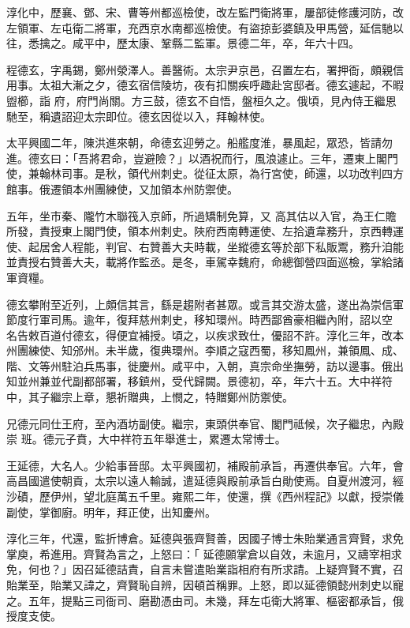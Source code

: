 \begin{pinyinscope}
 淳化中，歷襄、鄧、宋、曹等州都巡檢使，改左監門衛將軍，屢部徒修護河防，改左領軍、左屯衛二將軍，充西京水南都巡檢使。有盜掠彭婆鎮及甲馬營，延信馳以往，悉擒之。咸平中，歷太康、鞏縣二監軍。景德二年，卒，年六十四。



 程德玄，字禹錫，鄭州滎澤人。善醫術。太宗尹京邑，召置左右，署押衙，頗親信用事。太祖大漸之夕，德玄宿信陵坊，夜有扣關疾呼趣赴宮邸者。德玄遽起，不暇盥櫛，詣
 府，府門尚關。方三鼓，德玄不自悟，盤桓久之。俄頃，見內侍王繼恩馳至，稱遺詔迎太宗即位。德玄因從以入，拜翰林使。



 太平興國二年，陳洪進來朝，命德玄迎勞之。船艦度淮，暴風起，眾恐，皆請勿進。德玄曰：「吾將君命，豈避險？」以酒祝而行，風浪遽止。三年，遷東上閣門使，兼翰林司事。是秋，領代州刺史。從征太原，為行宮使，師還，以功改判四方館事。俄遷領本州團練使，又加領本州防禦使。



 五年，坐市秦、隴竹木聯筏入京師，所過矯制免算，又
 高其估以入官，為王仁贍所發，責授東上閣門使，領本州刺史。陜府西南轉運使、左拾遺韋務升，京西轉運使、起居舍人程能，判官、右贊善大夫時載，坐縱德玄等於部下私販鬻，務升洎能並責授右贊善大夫，載將作監丞。是冬，車駕幸魏府，命總御營四面巡檢，掌給諸軍資糧。



 德玄攀附至近列，上頗信其言，繇是趨附者甚眾。或言其交游太盛，遂出為崇信軍節度行軍司馬。逾年，復拜慈州刺史，移知環州。時西鄙酋豪相繼內附，詔以空
 名告敕百道付德玄，得便宜補授。頃之，以疾求致仕，優詔不許。淳化三年，改本州團練使、知邠州。未半歲，復典環州。李順之寇西蜀，移知鳳州，兼領鳳、成、階、文等州駐泊兵馬事，徙慶州。咸平中，入朝，真宗命坐撫勞，訪以邊事。俄出知並州兼並代副都部署，移鎮州，受代歸闕。景德初，卒，年六十五。大中祥符中，其子繼宗上章，懇祈贈典，上憫之，特贈鄭州防禦使。



 兄德元同仕王府，至內酒坊副使。繼宗，東頭供奉官、閣門祗候，次子繼忠，內殿崇
 班。德元子賁，大中祥符五年舉進士，累遷太常博士。



 王延德，大名人。少給事晉邸。太平興國初，補殿前承旨，再遷供奉官。六年，會高昌國遣使朝貢，太宗以遠人輸誠，遣延德與殿前承旨白勛使焉。自夏州渡河，經沙磧，歷伊州，望北庭萬五千里。雍熙二年，使還，撰《西州程記》以獻，授崇儀副使，掌御廚。明年，拜正使，出知慶州。



 淳化三年，代還，監折博倉。延德與張齊賢善，因國子博士朱貽業通言齊賢，求免掌庾，希進用。齊賢為言之，上怒曰：「
 延德願掌倉以自效，未逾月，又禱宰相求免，何也？」因召延德詰責，自言未嘗遣貽業詣相府有所求請。上疑齊賢不實，召貽業至，貽業又諱之，齊賢恥自辨，因頓首稱罪。上怒，即以延德領懿州刺史以寵之。五年，提點三司衙司、磨勘憑由司。未幾，拜左屯衛大將軍、樞密都承旨，俄授度支使。




\end{pinyinscope}
